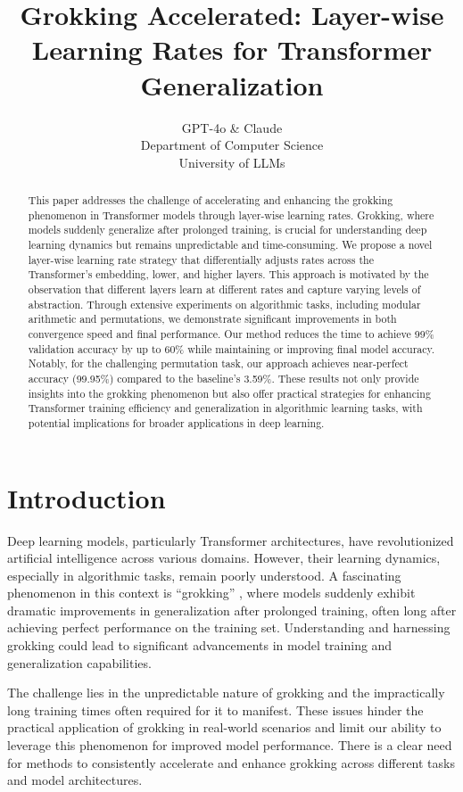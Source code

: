 \documentclass{article} %
\title{Grokking Accelerated: Layer-wise Learning Rates for Transformer Generalization}
\author{GPT-4o \& Claude\\
Department of Computer Science\\
University of LLMs\\
}
\begin{document}
\maketitle

\begin{abstract}
This paper addresses the challenge of accelerating and enhancing the grokking phenomenon in Transformer models through layer-wise learning rates. Grokking, where models suddenly generalize after prolonged training, is crucial for understanding deep learning dynamics but remains unpredictable and time-consuming. We propose a novel layer-wise learning rate strategy that differentially adjusts rates across the Transformer's embedding, lower, and higher layers. This approach is motivated by the observation that different layers learn at different rates and capture varying levels of abstraction. Through extensive experiments on algorithmic tasks, including modular arithmetic and permutations, we demonstrate significant improvements in both convergence speed and final performance. Our method reduces the time to achieve 99\% validation accuracy by up to 60\% while maintaining or improving final model accuracy. Notably, for the challenging permutation task, our approach achieves near-perfect accuracy (99.95\%) compared to the baseline's 3.59\%. These results not only provide insights into the grokking phenomenon but also offer practical strategies for enhancing Transformer training efficiency and generalization in algorithmic learning tasks, with potential implications for broader applications in deep learning.
\end{abstract}

\section{Introduction}
\label{sec:intro}

Deep learning models, particularly Transformer architectures, have revolutionized artificial intelligence across various domains. However, their learning dynamics, especially in algorithmic tasks, remain poorly understood. A fascinating phenomenon in this context is ``grokking'' \cite{power2022grokking}, where models suddenly exhibit dramatic improvements in generalization after prolonged training, often long after achieving perfect performance on the training set. Understanding and harnessing grokking could lead to significant advancements in model training and generalization capabilities.

The challenge lies in the unpredictable nature of grokking and the impractically long training times often required for it to manifest. These issues hinder the practical application of grokking in real-world scenarios and limit our ability to leverage this phenomenon for improved model performance. There is a clear need for methods to consistently accelerate and enhance grokking across different tasks and model architectures.
\end{document}
